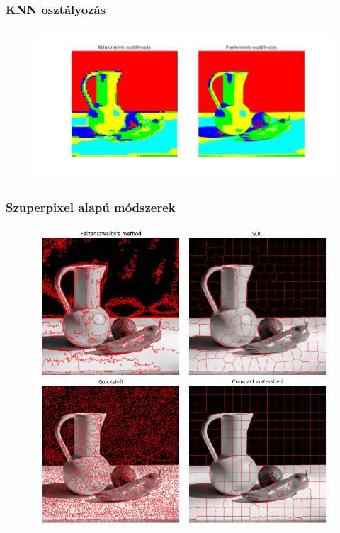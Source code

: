\documentclass{beamer}
\begin{document}
\begin{frame}[fragile]
\frametitle{KNN osztályozás}
\begin{figure}[!tbp]
  \centering
  \begin{minipage}[b]{1\textwidth}
      \includegraphics[width=\textwidth]{images/window_pixel_segmentation.png}
  \end{minipage}
\end{figure}
\end{frame}

\begin{frame}[fragile]
\frametitle{Szuperpixel alapú módszerek}

\begin{figure}[!tbp]
  \centering
  \begin{minipage}[b]{0.7\textwidth}
    \includegraphics[width=\textwidth]{images/superpixel_example.png}
  \end{minipage}
\end{figure}

\end{frame}
\end{document}
